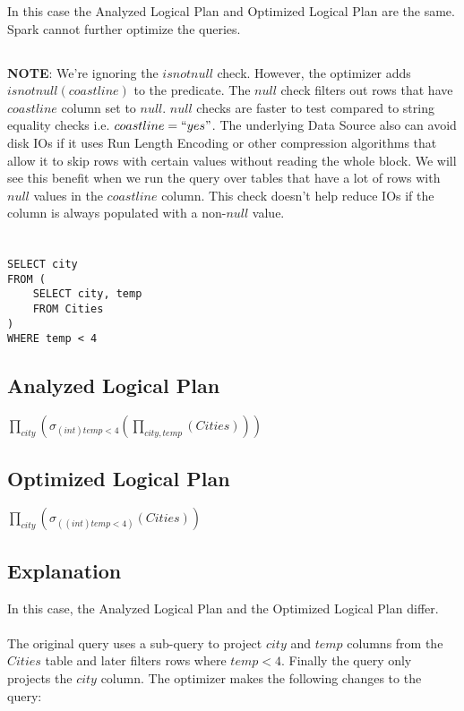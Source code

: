 \documentclass[12pt]{article}
\begin{document}
In this case the Analyzed Logical Plan and Optimized Logical Plan are the same. Spark cannot further optimize the queries.
\subsection*{}
\textbf{NOTE}: We're ignoring the $isnotnull$ check. However, the optimizer adds $isnotnull(coastline)$ to the predicate. The $ null$ check filters out rows that have $coastline$ column set to $null$. $null$ checks are faster to test compared to string equality checks i.e. $coastline = ``yes"$. The underlying Data Source also can avoid disk IOs if it uses Run Length Encoding or other compression algorithms that allow it to skip rows with certain values without reading the whole block. We will see this benefit when we run the query over tables that have a lot of rows with $null$ values in the $coastline$ column. This check doesn't help reduce IOs if the column is always populated with a non-$null$ value.
\newpage

\section{}
\begin{verbatim}
SELECT city
FROM (
    SELECT city, temp
    FROM Cities
)
WHERE temp < 4
\end{verbatim}

\subsection*{Analyzed Logical Plan}

$\prod_{city}(\sigma_{(int)temp < 4}(\prod_{city, temp}(Cities)))$

\subsection*{Optimized Logical Plan}

$\prod_{city}(\sigma_{((int)temp < 4)}(Cities))$

\subsection*{Explanation}

In this case, the Analyzed Logical Plan and the Optimized Logical Plan differ. 

\paragraph{} The original query uses a sub-query to project $city$ and $temp$ columns from the $Cities$ table and later filters rows where $temp < 4$. Finally the query only projects the $city$ column. The optimizer makes the following changes to the query:
\end{document}

